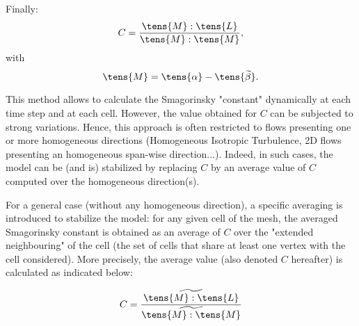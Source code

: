 Finally:
\begin{equation}
C = \frac{ \tens{M} : \tens{L} }{ \tens{M} : \tens{M}},
\end{equation}
with
\begin{equation}
\tens{M} = \tens{\alpha} - \tens{\widetilde{\beta}}.
\end{equation}

This method allows to calculate the Smagorinsky "constant" dynamically at
each time step and at each cell. However, the value obtained for $C$ can be
subjected to strong variations. Hence, this approach is often restricted to
flows presenting one or more homogeneous directions (Homogeneous Isotropic
Turbulence, 2D flows presenting an homogeneous span-wise direction...).
Indeed, in such cases, the model can be (and is) stabilized by replacing $C$
by an average value of $C$ computed over the homogeneous direction(s).

For a general case (without any homogeneous direction), a specific averaging
is introduced to stabilize the model: for any given cell of the mesh, the
averaged Smagorinsky constant is obtained as an average of $C$ over the
"extended neighbouring" of the cell (the set of cells that share at least
one vertex with the cell considered). More precisely, the average value
(also denoted $C$ hereafter) is calculated as indicated below:

\begin{equation}
C = \frac{\widetilde{ \tens{M} : \tens{L}}} {\widetilde{ \tens{M} : \tens{M}}}
\end{equation}



